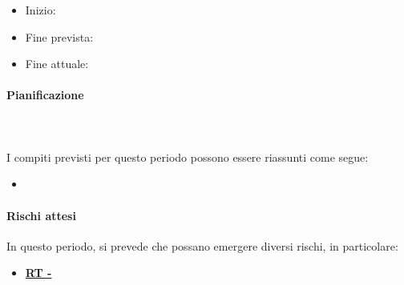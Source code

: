 \begin{itemize}
    \item Inizio:
    \item Fine prevista:
    \item Fine attuale:
\end{itemize}
\paragraph{Pianificazione} \hspace{1cm}
\\ \hspace{1cm} \\

I compiti previsti per questo periodo possono essere riassunti come segue:  
\begin{itemize}
    \item 
\end{itemize}

\paragraph{Rischi attesi}  
In questo periodo, si prevede che possano emergere diversi rischi, in particolare:

\begin{itemize}
    \item \textbf{\hyperlink{RT}{RT - }}
\end{itemize}


